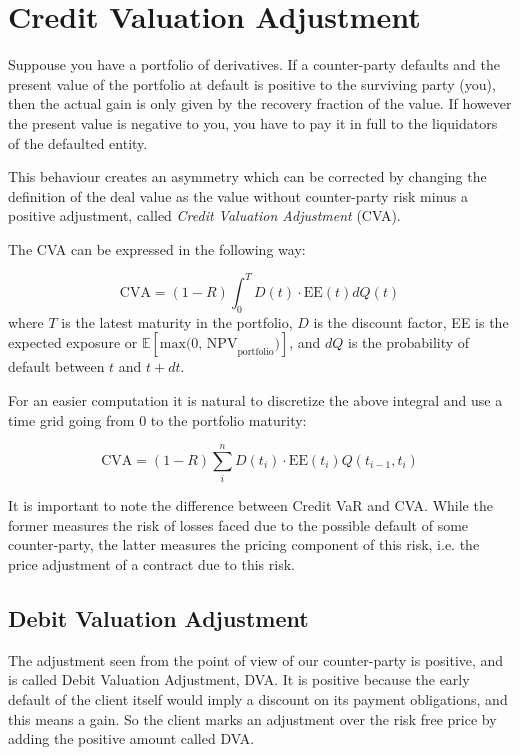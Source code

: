 \section{Credit Valuation Adjustment}
\label{credit-valuation-adjustment}

Suppouse you have a portfolio of derivatives. If a counter-party defaults and the present value of the portfolio at default is positive to the surviving party (you), then the actual gain is only given by the recovery fraction of the value. If however the present value is negative to you, you have to pay it in full to the liquidators of the defaulted entity.

This behaviour creates an asymmetry which can be corrected by changing the definition of the deal value as the value without counter-party risk minus a positive adjustment, called \emph{Credit Valuation Adjustment} (CVA).

The CVA can be expressed in the following way:

\begin{equation}
\text{CVA} = (1-R) \int_0^T D(t) \cdot \textrm{EE}(t) dQ(t)
\label{eq:cva}
\end{equation}
where $T$ is the latest maturity in the portfolio, $D$ is the discount factor, EE is the expected exposure or \(\mathbb{E}[\text{max(0, NPV}_\text{portfolio})]\), and $dQ$ is the probability of default between $t$ and $t+dt$.

For an easier computation it is natural to discretize the above integral and use a time grid going from 0 to the portfolio maturity:

\begin{equation}
\text{CVA} = (1-R) \sum_i^n D(t_i) \cdot \mathrm{EE}(t_i) Q(t_{i-1}, t_i)
\label{eq:cva_discrete}
\end{equation}

It is important to note the difference between Credit VaR and CVA. While the former measures the risk of losses faced due to the possible default of some counter-party, the latter measures the pricing component of this risk, i.e. the price adjustment of a contract due to this risk.

\subsection{Debit Valuation Adjustment}

The adjustment seen from the point of view of our counter-party is positive, and is called Debit Valuation Adjustment, DVA. It is positive because the early default of the client itself would imply a discount on its payment obligations, and this means a gain. So the client marks an adjustment over the risk free price by adding the positive amount called DVA. 


